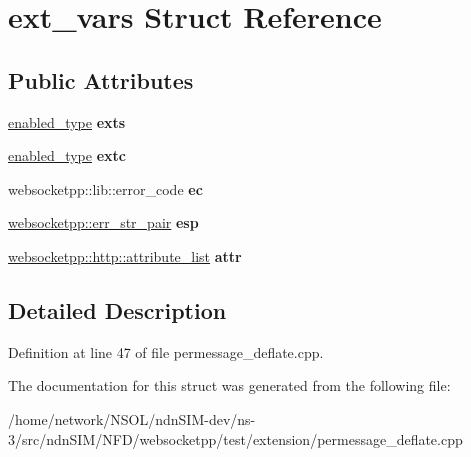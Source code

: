 \hypertarget{structext__vars}{}\section{ext\+\_\+vars Struct Reference}
\label{structext__vars}
\subsection*{Public Attributes}
\begin{DoxyCompactItemize}
\item 
\hyperlink{classwebsocketpp_1_1extensions_1_1permessage__deflate_1_1enabled}{enabled\+\_\+type} {\bfseries exts}\hypertarget{structext__vars_a1b024f0d53a4e1ab0ed89f3ba2f3b6e9}{}\label{structext__vars_a1b024f0d53a4e1ab0ed89f3ba2f3b6e9}

\item 
\hyperlink{classwebsocketpp_1_1extensions_1_1permessage__deflate_1_1enabled}{enabled\+\_\+type} {\bfseries extc}\hypertarget{structext__vars_a9df65e98530d8822748597babc1e14cf}{}\label{structext__vars_a9df65e98530d8822748597babc1e14cf}

\item 
websocketpp\+::lib\+::error\+\_\+code {\bfseries ec}\hypertarget{structext__vars_a25675ae1fac85b0ee8a2fb54feb9244a}{}\label{structext__vars_a25675ae1fac85b0ee8a2fb54feb9244a}

\item 
\hyperlink{namespacewebsocketpp_abecf95d53c9387716b157daae84441f3}{websocketpp\+::err\+\_\+str\+\_\+pair} {\bfseries esp}\hypertarget{structext__vars_a1cb78d1cc907c4761f1cdfa5bf2abb4f}{}\label{structext__vars_a1cb78d1cc907c4761f1cdfa5bf2abb4f}

\item 
\hyperlink{namespacewebsocketpp_1_1http_a9744f4104772b987aa9e86c35ce1357b}{websocketpp\+::http\+::attribute\+\_\+list} {\bfseries attr}\hypertarget{structext__vars_a50a3f57a467119dcf639f4df92402194}{}\label{structext__vars_a50a3f57a467119dcf639f4df92402194}

\end{DoxyCompactItemize}


\subsection{Detailed Description}


Definition at line 47 of file permessage\+\_\+deflate.\+cpp.



The documentation for this struct was generated from the following file\+:\begin{DoxyCompactItemize}
\item 
/home/network/\+N\+S\+O\+L/ndn\+S\+I\+M-\/dev/ns-\/3/src/ndn\+S\+I\+M/\+N\+F\+D/websocketpp/test/extension/permessage\+\_\+deflate.\+cpp\end{DoxyCompactItemize}
